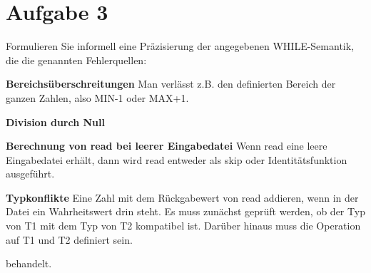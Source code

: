 \documentclass[ngerman,a4paper]{report}
\begin{document}
\section*{Aufgabe 3}
Formulieren Sie informell eine Präzisierung der angegebenen WHILE-Semantik, die die genannten Fehlerquellen:
\begin{compactenum}
\item [\textbf{Bereichsüberschreitungen}] Man verlässt z.B. den definierten Bereich der ganzen Zahlen, also MIN-1 oder MAX+1. 
\item [\textbf{Division durch Null}] 
\item [\textbf{Berechnung von read bei leerer Eingabedatei}] Wenn read eine leere Eingabedatei erhält, dann wird read entweder als skip oder Identitätsfunktion ausgeführt.
\item [\textbf{Typkonflikte}] Eine Zahl mit dem Rückgabewert von read addieren, wenn in der Datei ein Wahrheitswert drin steht. Es muss zunächst geprüft werden, ob der Typ von T1 mit dem Typ von T2 kompatibel ist. Darüber hinaus muss die Operation auf T1 und T2 definiert sein.
\end{compactenum}
behandelt.
\end{document}
